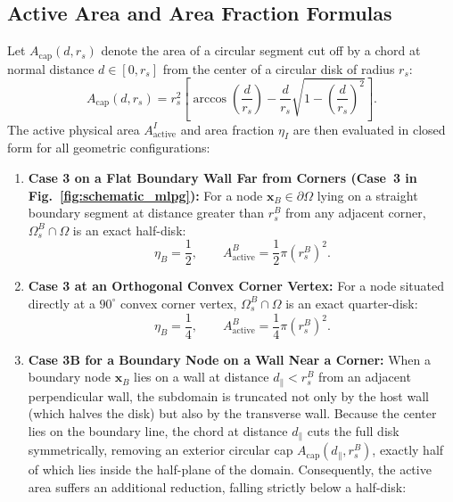 \documentclass[preprint,12pt]{elsarticle}
\begin{document}
\subsection{Active Area and Area Fraction Formulas}
Let $A_{\mathrm{cap}}(d, r_s)$ denote the area of a circular segment cut off by a chord at normal distance $d \in [0, r_s]$ from the center of a circular disk of radius $r_s$:
\begin{equation}
    A_{\mathrm{cap}}(d, r_s) = r_s^2 \left[ \arccos\left(\frac{d}{r_s}\right) - \frac{d}{r_s} \sqrt{1 - \left(\frac{d}{r_s}\right)^2} \right].
    \label{eq:cap_area_formula}
\end{equation}
The active physical area $A_{\mathrm{active}}^I$ and area fraction $\eta_I$ are then evaluated in closed form for all geometric configurations:
\begin{enumerate}
    \item \textbf{Case 3 on a Flat Boundary Wall Far from Corners (Case~3 in Fig.~\ref{fig:schematic_mlpg}):} For a node $\mathbf{x}_B \in \partial\Omega$ lying on a straight boundary segment at distance greater than $r_s^B$ from any adjacent corner, $\Omega_s^B \cap \Omega$ is an exact half-disk:
          \begin{equation}
              \eta_B = \frac{1}{2}, \qquad A_{\mathrm{active}}^B = \frac{1}{2} \pi (r_s^B)^2.
              \label{eq:eta_half_disk}
          \end{equation}
    \item \textbf{Case 3 at an Orthogonal Convex Corner Vertex:} For a node situated directly at a $90^\circ$ convex corner vertex, $\Omega_s^B \cap \Omega$ is an exact quarter-disk:
          \begin{equation}
              \eta_B = \frac{1}{4}, \qquad A_{\mathrm{active}}^B = \frac{1}{4} \pi (r_s^B)^2.
              \label{eq:eta_quarter_disk}
          \end{equation}
    \item \textbf{Case 3B for a Boundary Node on a Wall Near a Corner:} When a boundary node $\mathbf{x}_B$ lies on a wall at distance $d_{\parallel} < r_s^B$ from an adjacent perpendicular wall, the subdomain is truncated not only by the host wall (which halves the disk) but also by the transverse wall. Because the center lies on the boundary line, the chord at distance $d_{\parallel}$ cuts the full disk symmetrically, removing an exterior circular cap $A_{\mathrm{cap}}(d_{\parallel}, r_s^B)$, exactly half of which lies inside the half-plane of the domain. Consequently, the active area suffers an additional reduction, falling strictly below a half-disk:

\end{enumerate}
\end{document}
